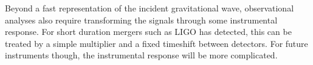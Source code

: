 \documentclass[aps,showpacs,twocolumn,
prd,superscriptaddress,nofootinbib]{revtex4-1}
\newcommand{\jgb}[1]{{\color{DarkGreen} #1}}
\begin{document}
Beyond a fast representation of the incident gravitational wave, observational analyses also require transforming the signals through some instrumental response. For short duration mergers such as LIGO  has detected, this can be treated by a simple multiplier and a fixed timeshift between detectors.  For future instruments though, the instrumental response will be more complicated.

\end{document}
